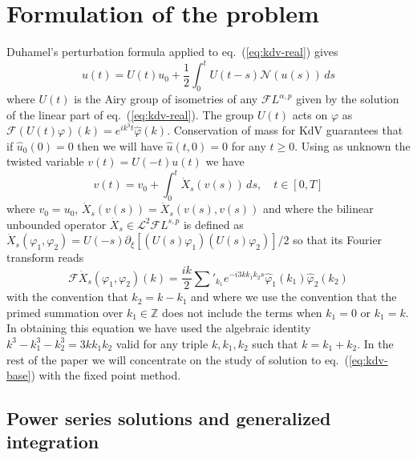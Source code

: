 \documentclass[a4paper,11pt,reqno]{article}
\newcommand{\FF}{\mathcal{F}}
\newcommand{\LL}{\mathcal{L}}
\newcommand{\ZZ}{\mathbb{Z}}
\newcommand{\wh}{\widehat}
\begin{document}
\section{Formulation of the problem}
\label{sec:intro}
Duhamel's perturbation formula applied to eq.~(\ref{eq:kdv-real}) gives
\begin{equation}
\label{eq:kdv-mild}
u(t) = U(t) u_0 + \frac{1}{2} \int_0^t U(t-s) \mathcal{N}(u(s))\, ds 
\end{equation}
where  $U(t)$ is the Airy group of isometries of any $\FF L^{\alpha,p}$ given by the
solution of the linear part of eq.~(\ref{eq:kdv-real}). The group $U(t)$ acts on $\varphi$ as
$
\FF (U(t) \varphi)(k) = e^{i k^3 t} \wh \varphi(k)
$.
 Conservation of mass for KdV guarantees that  if
$\wh u_0(0) = 0$ then we will have $\wh u(t,0) = 0$ for any $t \ge 0$.
Using as
unknown the twisted variable $v(t) = U(-t) u(t)$ we have
\begin{equation}
  \label{eq:kdv-base}
 v(t) =   v_0 + \int_0^t \dot X_s( v(s))\, ds , \quad t \in [0,T]\end{equation}
where $v_0 = u_0$, $\dot X_s( v(s)) = \dot X_s( v(s),v(s))$ and where the bilinear unbounded operator $\dot X_s \in \LL^2 \FF L^{s,p}$ is defined as $\dot X_s (\varphi_1, \varphi_2) = U(-s)\partial_\xi[(U(s)\varphi_1) (U(s)\varphi_2)]/2$ so that its Fourier transform reads
$$
\FF \dot X_s(\varphi_1,\varphi_2)(k) = 
\frac{ik}2 \sum'_{k_1} e^{- i 3 k k_1 k_2 s}
  \wh \varphi_1(k_1) \wh \varphi_2(k_2) 
$$
with the convention that $k_2 = k-k_1$ and where we use the
convention that the primed summation over $k_1 \in \ZZ$ does not include the
terms when $k_1 = 0$ or $k_1 = k$. In obtaining this equation
we have used the algebraic identity $k^3 - k_1^3 - k_2^3 = 3 k k_1
k_2$ valid for any triple $k,k_1,k_2$ such that $k = k_1 + k_2$.
In the rest of the paper we will concentrate on the study of solution
to eq.~(\ref{eq:kdv-base}) with the fixed point method. 

\subsection{Power series solutions and generalized integration}
\end{document}
